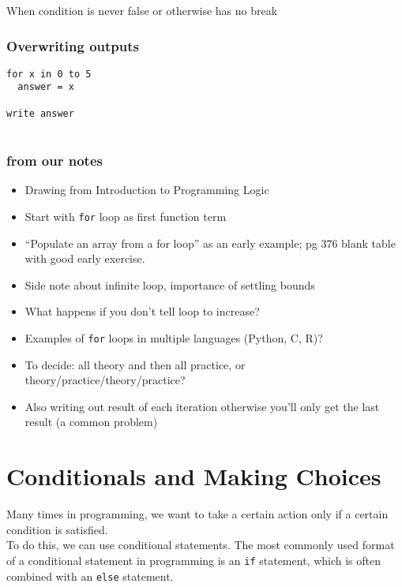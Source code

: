 \documentclass[
]{book}
\providecommand{\tightlist}{%
  \setlength{\itemsep}{0pt}\setlength{\parskip}{0pt}}
\begin{document}
When condition is never false or otherwise has no break

\subsection{Overwriting outputs}\label{overwriting-outputs}

\begin{verbatim}
for x in 0 to 5 
  answer = x

write answer
  
\end{verbatim}

\subsection{from our notes}\label{from-our-notes}

\begin{itemize}
\tightlist
\item
  Drawing from Introduction to Programming Logic \citep{lynne_ohanlon_introduction_2000}
\item
  Start with \texttt{for} loop as first function term
\item
  ``Populate an array from a for loop'' as an early example; pg 376 blank table with good early exercise.
\item
  Side note about infinite loop, importance of settling bounds
\item
  What happens if you don't tell loop to increase?
\item
  Examples of \texttt{for} loops in multiple languages (Python, C, R)?
\item
  To decide: all theory and then all practice, or theory/practice/theory/practice?
\item
  Also writing out result of each iteration otherwise you'll only get the last result (a common problem)
\end{itemize}

\chapter{Conditionals and Making Choices}\label{conditionals-and-making-choices}

Many times in programming, we want to take a certain action only if a certain condition is satisfied.\\

To do this, we can use conditional statements. The most commonly used format of a conditional statement in programming is an \texttt{if} statement, which is often combined with an \texttt{else} statement.\\
\end{document}
